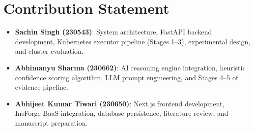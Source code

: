 \documentclass[12pt,onecolumn,draftclsnofoot]{IEEEtran}
\begin{document}
\section*{Contribution Statement}

\begin{itemize}
  \item \textbf{Sachin Singh (230543)}: System architecture, FastAPI backend development, Kubernetes executor pipeline (Stages 1--3), experimental design, and cluster evaluation.
  \item \textbf{Abhimanyu Sharma (230662)}: AI reasoning engine integration, heuristic confidence scoring algorithm, LLM prompt engineering, and Stages 4--5 of evidence pipeline.
  \item \textbf{Abhijeet Kumar Tiwari (230650)}: Next.js frontend development, InsForge BaaS integration, database persistence, literature review, and manuscript preparation.
\end{itemize}



\end{document}
